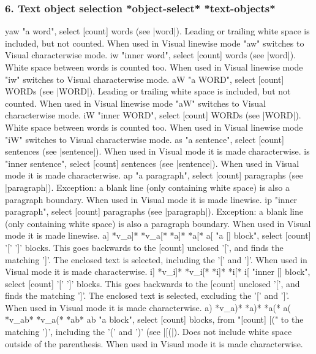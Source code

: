 \documentclass{beamer}
\begin{document}
\begin{frame}
    \frametitle{6. Text object selection            *object-select* *text-objects*}
    yaw         "a word", select [count] words (see |word|).
    Leading or trailing white space is included, but not
    counted.
    When used in Visual linewise mode "aw" switches to
    Visual characterwise mode.
    iw          "inner word", select [count] words (see |word|).
    White space between words is counted too.
    When used in Visual linewise mode "iw" switches to
    Visual characterwise mode.
    aW          "a WORD", select [count] WORDs (see |WORD|).
    Leading or trailing white space is included, but not
    counted.
    When used in Visual linewise mode "aW" switches to
    Visual characterwise mode.
    iW          "inner WORD", select [count] WORDs (see |WORD|).
    White space between words is counted too.
    When used in Visual linewise mode "iW" switches to
    Visual characterwise mode.
    as          "a sentence", select [count] sentences (see
    |sentence|).
    When used in Visual mode it is made characterwise.
    is          "inner sentence", select [count] sentences (see
    |sentence|).
    When used in Visual mode it is made characterwise.
    ap          "a paragraph", select [count] paragraphs (see
    |paragraph|).
    Exception: a blank line (only containing white space)
    is also a paragraph boundary.
    When used in Visual mode it is made linewise.
    ip          "inner paragraph", select [count] paragraphs (see
    |paragraph|).
    Exception: a blank line (only containing white space)
    is also a paragraph boundary.
    When used in Visual mode it is made linewise.
a]                      *v\_a]* *v\_a[* *a]* *a[*
  a[            "a [] block", select [count] '[' ']' blocks.  This
    goes backwards to the [count] unclosed '[', and finds
    the matching ']'.  The enclosed text is selected,
    including the '[' and ']'.
    When used in Visual mode it is made characterwise.
i]                      *v\_i]* *v\_i[* *i]* *i[*
  i[            "inner [] block", select [count] '[' ']' blocks.  This
    goes backwards to the [count] unclosed '[', and finds
    the matching ']'.  The enclosed text is selected,
    excluding the '[' and ']'.
    When used in Visual mode it is made characterwise.
    a)                          *v\_a)* *a)* *a(*
    a(                          *v\_ab* *v\_a(* *ab*
    ab          "a block", select [count] blocks, from "[count] [(" to
      the matching ')', including the '(' and ')' (see
      |[(|).  Does not include white space outside of the
        parenthesis.
        When used in Visual mode it is made characterwise.


\end{frame}
\end{document}
